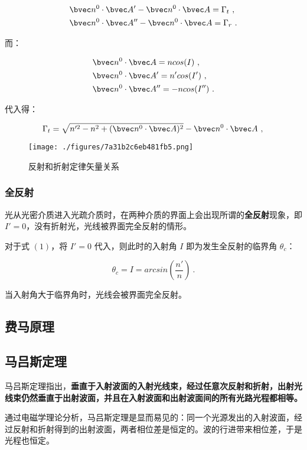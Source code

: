 \begin{equation}
\begin{align*}
& \bvec n^0 \cdot \bvec A' - \bvec n^0 \cdot \bvec A = \Gamma _ t ~, \\
& \bvec n^0 \cdot \bvec A'' - \bvec n^0 \cdot \bvec A = \Gamma _ r ~.
\end{align*}
\end{equation}

而：

\begin{equation}
\begin{align*}
& \bvec n^0 \cdot \bvec A = ncos(I) ~, \\
& \bvec n^0 \cdot \bvec A' = n'cos(I') ~, \\
& \bvec n^0 \cdot \bvec A'' = -ncos(I'') ~.
\end{align*}
\end{equation}

代入得：

\begin{equation}
\Gamma _ t = \sqrt{n'^2 - n^2 + (\bvec n^0 \cdot \bvec A)^2} - \bvec n^0 \cdot \bvec A ~, \\
\end{equation}

\begin{figure}[ht]
\centering
\texttt{[image: ./figures/7a31b2c6eb481fb5.png]}
\caption{反射和折射定律矢量关系} \label{fig_GeOp2_2}
\end{figure}

\subsubsection{全反射}

光从光密介质进入光疏介质时，在两种介质的界面上会出现所谓的\textbf{全反射}现象，即 $I'=0$，没有折射光，光线被界面完全反射的情形。

对于式 $(1)$，将 $I'=0$ 代入，则此时的入射角 $I$ 即为发生全反射的临界角 $\theta_c$：

\begin{equation}
\theta _c=I=arcsin(\frac{n'}{n}) ~.
\end{equation}

当入射角大于临界角时，光线会被界面完全反射。

\subsection{费马原理}

\subsection{马吕斯定理}

马吕斯定理指出，\textbf{垂直于入射波面的入射光线束，经过任意次反射和折射，出射光线束仍然垂直于出射波面，并且在入射波面和出射波面间的所有光路光程都相等。}

通过电磁学理论分析，马吕斯定理是显而易见的：同一个光源发出的入射波面，经过反射和折射得到的出射波面，两者相位差是恒定的。波的行进带来相位差，于是光程也恒定。
